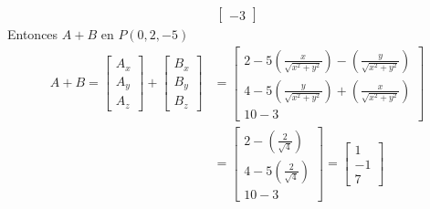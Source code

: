 \begin{problema}
\begin{enumerate}
\begin{sol}
\begin{align*}
\begin{bmatrix}
                -3
            \end{bmatrix}
        \end{align*}
        Entonces $A+B$ en $P(0,2,-5)$
        \begin{align*}
            A+B = \begin{bmatrix}
                A_x\\
                A_y\\
                A_z
            \end{bmatrix}+\begin{bmatrix}
                B_x\\
                B_y\\
                B_z
            \end{bmatrix} &= \begin{bmatrix}
                2-5\left(\frac{x}{\sqrt{x^2+y^2}}\right) -\left(\frac{y}{\sqrt{x^2+y^2}}\right) \\
            4-5\left(\frac{y}{\sqrt{x^2+y^2}}\right)+ \left(\frac{x}{\sqrt{x^2+y^2}}\right) \\
                10-3
            \end{bmatrix}\\
            &= \begin{bmatrix}
                2-\left(\frac{2}{\sqrt{4}}\right) \\
            4-5\left(\frac{2}{\sqrt{4}}\right) \\
                10-3
            \end{bmatrix}=\begin{bmatrix}
                1 \\
            -1  \\
                7
            \end{bmatrix}
        \end{align*}
        \end{sol}


\end{enumerate}
\end{problema}
